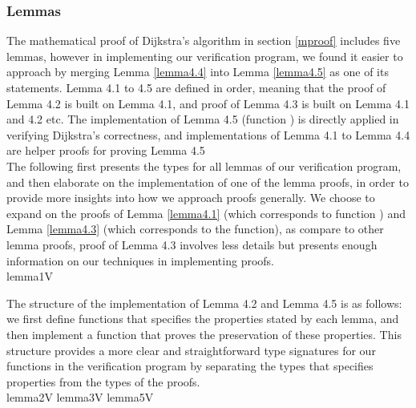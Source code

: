 \subsubsection{Lemmas} \label{lemmas}
The mathematical proof of Dijkstra's algorithm in section \ref{mproof} includes five lemmas, however in implementing our verification program, we found it easier to approach by merging Lemma \ref{lemma4.4} into Lemma \ref{lemma4.5} as one of its statements. Lemma 4.1 to 4.5 are defined in order, meaning that the proof of Lemma 4.2 is built on Lemma 4.1, and proof of Lemma 4.3 is built on Lemma 4.1 and 4.2 etc. The implementation of Lemma 4.5 (function ) is directly applied in verifying Dijkstra's correctness, and implementations of Lemma 4.1 to Lemma 4.4 are helper proofs for proving Lemma 4.5
\\

The following first presents the types for all lemmas of our verification program, and then elaborate on the implementation of one of the lemma proofs, in order to provide more insights into how we approach proofs generally. We choose to expand on the proofs of Lemma \ref{lemma4.1} (which corresponds to function ) and Lemma \ref{lemma4.3} (which corresponds to the  function), as compare to other lemma proofs, proof of Lemma 4.3 involves less details but presents enough information on our techniques in implementing proofs. 
\\

{lemma1V}

The structure of the implementation of Lemma 4.2 and Lemma 4.5 is as follows: we first define functions that specifies the  properties stated by each lemma, and then implement a function that proves the preservation of these properties. This structure provides a more clear and straightforward type signatures for our functions in the verification program by separating the types that specifies  properties from the types of the proofs. 
\\

{lemma2V}
{lemma3V}
{lemma5V}